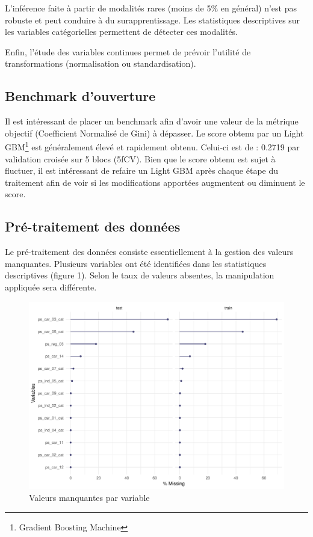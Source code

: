 \documentclass[french]{article}
\begin{document}
\begin{multicols}{2}
L'inférence faite à partir de modalités rares (moins de 5\% en général) n'est pas robuste et peut conduire à du surapprentissage. Les statistiques descriptives sur les variables catégorielles permettent de détecter ces modalités.

Enfin, l'étude des variables continues permet de prévoir l'utilité de transformations (normalisation ou standardisation).

\subsection{Benchmark d'ouverture}

Il est intéressant de placer un benchmark afin d'avoir une valeur de la métrique objectif (Coefficient Normalisé de Gini) à dépasser. Le score obtenu par un Light GBM\footnote{Gradient Boosting Machine} est généralement élevé et rapidement obtenu. Celui-ci est de : 0.2719 par validation croisée sur 5 blocs (5fCV). Bien que le score obtenu est sujet à fluctuer, il est intéressant de refaire un Light GBM après chaque étape du traitement afin de voir si les modifications apportées augmentent ou diminuent le score.


\subsection{Pré-traitement des données}

Le pré-traitement des données consiste essentiellement à la gestion des valeurs manquantes. Plusieurs variables ont été identifiées dans les statistiques descriptives (figure 1). Selon le taux de valeurs absentes, la manipulation appliquée sera différente. 

\begin{figure}[H] \centering
  \includegraphics[width = \columnwidth]{img/missing_values}
  \caption{Valeurs manquantes par variable}
\end{figure}



\end{multicols}
\end{document}
